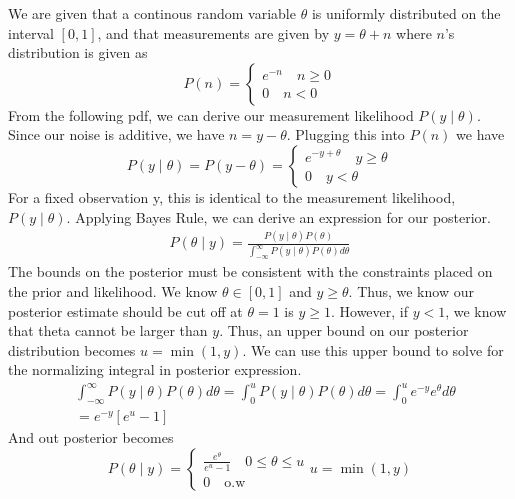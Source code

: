 \documentclass[11pt]{article}
\begin{document}
We are given that a continous random variable $\theta$ is uniformly distributed on the interval $[0,1]$, and that measurements are given by
$y = \theta + n$ where $n$'s distribution is given as
\[
P(n) = \begin{cases}
    e^{-n} \quad n \geq 0 \\
    0 \quad n < 0
\end{cases}
\]
From the following pdf, we can derive our measurement likelihood $P(y\mid\theta)$. Since our noise is additive, we have $n = y-\theta$. Plugging this into $P(n)$ we have
\[
P(y\mid\theta) = P(y-\theta) = \begin{cases}
    e^{-y+\theta} \quad y \geq \theta \\
    0 \quad y < \theta
\end{cases}
\]
For a fixed observation y, this is identical to the measurement likelihood, $P(y\mid\theta)$. Applying Bayes Rule, we can derive an expression for our posterior.
\begin{align*}
    P(\theta \mid y) = \frac{P(y\mid\theta)P(\theta)}{\int_{-\infty}^{\infty}P(y\mid\theta)P(\theta) d\theta}
\end{align*}
The bounds on the posterior must be consistent with the constraints placed on the prior and likelihood. We know $\theta \in [0,1]$ and $y \geq \theta$.
Thus, we know our posterior estimate should be cut off at $\theta = 1$ is $y \geq 1$. However, if $y < 1$, we know that theta cannot be larger than $y$. Thus, an upper bound on our posterior distribution becomes
$u = \min(1,y)$. We can use this upper bound to solve for the normalizing integral in posterior expression.
\begin{align*}
    & \int_{-\infty}^{\infty}P(y\mid\theta)P(\theta) d\theta = \int_{0}^{u}P(y\mid\theta)P(\theta) d\theta = \int_{0}^{u}e^{-y}e^{\theta} d\theta \\
    & = e^{-y}[e^u - 1]
\end{align*}
And out posterior becomes 
\[
    P(\theta \mid y) = \begin{cases}
        \frac{e^\theta}{e^u-1} \quad 0 \leq \theta \leq u \\ 
        0 \quad \mathrm{o.w}
    \end{cases} u = \min(1,y)
\]
\end{document}
